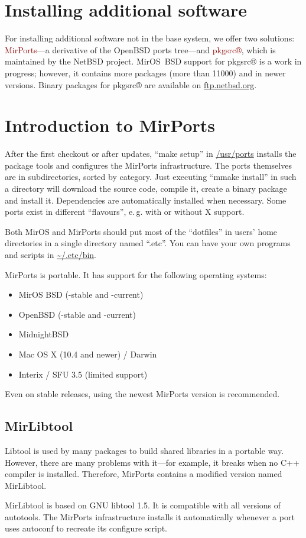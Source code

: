 \documentclass[a4paper,landscape,11pt,notumble]{leaflet}
\begin{document}
\section{Installing additional software}

For installing additional software not in the base system, we offer two solutions: 
\textcolor{darkred}{MirPorts}---a derivative of the OpenBSD ports tree---and \textcolor{darkred}{pkgsrc®}, which is maintained by the NetBSD project.
MirOS~BSD support for pkgsrc® is a work in progress; however, it contains more packages (more than 11000) and in newer versions.
Binary packages for pkgsrc® are available on \url{ftp.netbsd.org}.

\newpage

\section{Introduction to MirPorts}

After the first checkout or after updates, ``make setup'' in \url{/usr/ports} installs the package tools and configures the MirPorts infrastructure. The ports themselves are in subdirectories, sorted by category. Just executing ``mmake install'' in such a directory will download the source code, compile it, create a binary package and install it. Dependencies are automatically installed when necessary. Some ports exist in different ``flavours'', e.\,g. with or without X support.

Both MirOS and MirPorts should put most of the ``dotfiles'' in users' home directories in a single directory named ``.etc''. You can have your own programs and scripts in \url{~/.etc/bin}.

MirPorts is portable. It has support for the following operating systems:

\begin{itemize}
\item MirOS BSD (-stable and -current)
\item OpenBSD (-stable and -current)
\item MidnightBSD
\item Mac OS X (10.4 and newer) / Darwin
\item Interix / SFU 3.5 (limited support)
\end{itemize}

\noindent
Even on stable releases, using the newest MirPorts version is recommended. 

\subsection{MirLibtool}

Libtool is used by many packages to build shared libraries in  a portable way. However, there are many problems with it—for example, it breaks when no C++ compiler is installed. Therefore, MirPorts contains a modified version named MirLibtool.

MirLibtool is based on GNU libtool 1.5. It is compatible with all versions of autotools. The MirPorts infrastructure installs it automatically whenever a port uses autoconf to recreate its configure script.
\end{document}
